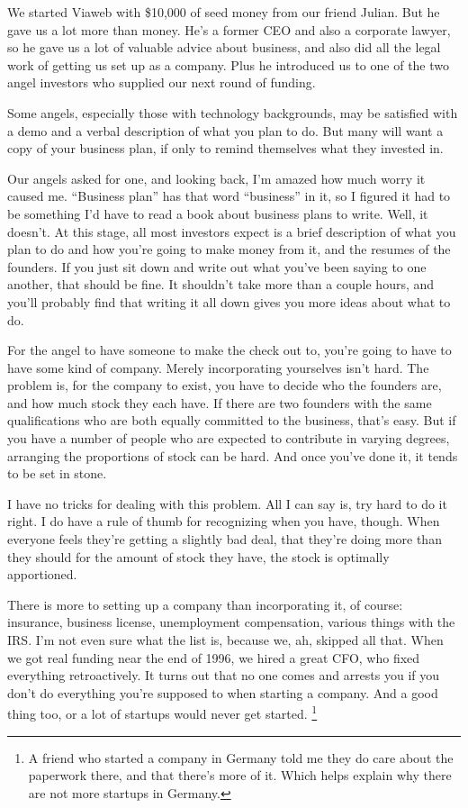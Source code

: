 \documentclass[12pt]{book}
\begin{document}
We started Viaweb with \$10,000 of seed money from our friend Julian.
But he gave us a lot more than money. He's a former CEO and also a
corporate lawyer, so he gave us a lot of valuable advice about business,
and also did all the legal work of getting us set up as a company. Plus
he introduced us to one of the two angel investors who supplied our next
round of funding.

Some angels, especially those with technology backgrounds, may be
satisfied with a demo and a verbal description of what you plan to do.
But many will want a copy of your business plan, if only to remind
themselves what they invested in.

Our angels asked for one, and looking back, I'm amazed how much worry it
caused me. ``Business plan'' has that word ``business'' in it, so I
figured it had to be something I'd have to read a book about business
plans to write. Well, it doesn't. At this stage, all most investors
expect is a brief description of what you plan to do and how you're
going to make money from it, and the resumes of the founders. If you
just sit down and write out what you've been saying to one another, that
should be fine. It shouldn't take more than a couple hours, and you'll
probably find that writing it all down gives you more ideas about what
to do.

For the angel to have someone to make the check out to, you're going to
have to have some kind of company. Merely incorporating yourselves isn't
hard. The problem is, for the company to exist, you have to decide who
the founders are, and how much stock they each have. If there are two
founders with the same qualifications who are both equally committed to
the business, that's easy. But if you have a number of people who are
expected to contribute in varying degrees, arranging the proportions of
stock can be hard. And once you've done it, it tends to be set in stone.

I have no tricks for dealing with this problem. All I can say is, try
hard to do it right. I do have a rule of thumb for recognizing when you
have, though. When everyone feels they're getting a slightly bad deal,
that they're doing more than they should for the amount of stock they
have, the stock is optimally apportioned.

There is more to setting up a company than incorporating it, of course:
insurance, business license, unemployment compensation, various things
with the IRS. I'm not even sure what the list is, because we, ah,
skipped all that. When we got real funding near the end of 1996, we
hired a great CFO, who fixed everything retroactively. It turns out that
no one comes and arrests you if you don't do everything you're supposed
to when starting a company. And a good thing too, or a lot of startups
would never get started. \footnote{A friend who started a company in Germany told me they do care
about the paperwork there, and that there's more of it. Which helps
explain why there are not more startups in Germany.}
\end{document}
